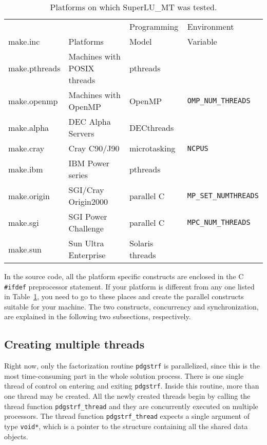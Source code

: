 \begin{table}
\begin{center}
\begin{tabular}{|l|l|l|l|} \hline
		&		&Programming	&Environment \\
make.inc	&Platforms 	&Model		&Variable\\ \hline
make.pthreads   &Machines with POSIX threads    &pthreads	& \\
make.openmp     &Machines with OpenMP   &OpenMP	& {\tt OMP\_NUM\_THREADS} \\
make.alpha      &DEC Alpha Servers 	&DECthreads	& \\
make.cray       &Cray C90/J90 	     &microtasking &{\tt NCPUS}\\
make.ibm        &IBM Power series 	&pthreads	& \\
make.origin     &SGI/Cray Origin2000 &parallel C &{\tt MP\_SET\_NUMTHREADS}\\
make.sgi        &SGI Power Challenge &parallel C &{\tt MPC\_NUM\_THREADS}\\
make.sun        &Sun Ultra Enterprise 	&Solaris threads	& \\
  \hline
\end{tabular}
\end{center}
\vspace{-.1in}
\caption{Platforms on which SuperLU\_MT was tested.}
\label{tab:mt_machines}
\end{table}

In the source code, all the platform specific constructs are enclosed in 
the C {\tt \#ifdef} preprocessor statement.
If your platform is different from any one listed in 
Table~\ref{tab:mt_machines}, you need to go to these places and
create the parallel constructs suitable for your machine.
The two constructs, concurrency and synchronization, are explained 
in the following two subsections, respectively.

\subsection{Creating multiple threads}
Right now, only the factorization routine {\tt pdgstrf} is parallelized,
since this is the most time-consuming part in the whole solution process.
There is one single thread of control on entering and exiting {\tt pdgstrf}.
Inside this routine, more than one thread may be created.
All the newly created threads begin by calling the thread function
{\tt pdgstrf\_thread} and they are concurrently executed on multiple
processors. The thread function {\tt pdgstrf\_thread} expects a single
argument of type {\tt void*}, which is a pointer to the structure
containing all the shared data objects.

